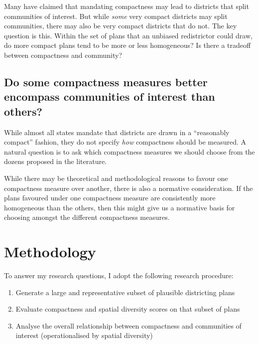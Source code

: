 \documentclass[]{article}
\providecommand{\tightlist}{%
  \setlength{\itemsep}{0pt}\setlength{\parskip}{0pt}}
\begin{document}
Many have claimed that mandating compactness may lead to districts that
split communities of interest. But while \emph{some} very compact
districts may split communities, there may also be very compact
districts that do not. The key question is this. Within the set of plans
that an unbiased redistrictor could draw, do more compact plans tend to
be more or less homogeneous? Is there a tradeoff between compactness and
community?

\hypertarget{do-some-compactness-measures-better-encompass-communities-of-interest-than-others}{%
\subsection{Do some compactness measures better encompass communities of
interest than
others?}\label{do-some-compactness-measures-better-encompass-communities-of-interest-than-others}}

While almost all states mandate that districts are drawn in a
``reasonably compact'' fashion, they do not specify \emph{how}
compactness should be measured. A natural question is to ask which
compactness measures we should choose from the dozens proposed in the
literature.

While there may be theoretical and methodological reasons to favour one
compactness measure over another, there is also a normative
consideration. If the plans favoured under one compactness measure are
consistently more homogeneous than the others, then this might give us a
normative basis for choosing amongst the different compactness measures.

\hypertarget{methodology}{%
\section{Methodology}\label{methodology}}

To answer my research questions, I adopt the following research
procedure:

\begin{enumerate}
\def\labelenumi{\arabic{enumi}.}
\tightlist
\item
  Generate a large and representative subset of plausible districting
  plans
\item
  Evaluate compactness and spatial diversity scores on that subset of
  plans
\item
  Analyse the overall relationship between compactness and communities
  of interest (operationalised by spatial diversity)
\end{enumerate}
\end{document}
